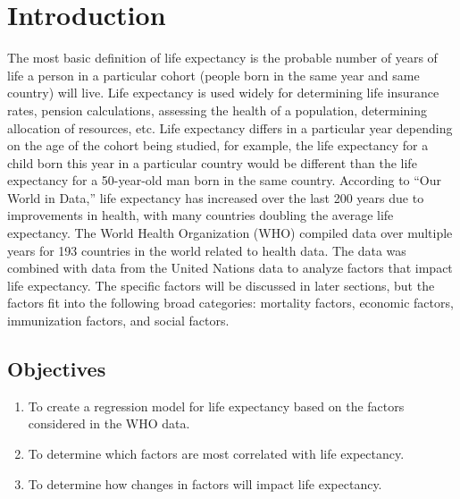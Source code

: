 \section{Introduction}
The most basic definition of life expectancy is the probable number of years of life a person in a particular cohort (people born in the same year and same country) will live. Life expectancy is used widely for determining life insurance rates, pension calculations, assessing the health of a population, determining allocation of resources, etc. Life expectancy differs in a particular year depending on the age of the cohort being studied, for example, the life expectancy for a child born this year in a particular country would be different than the life expectancy for a 50-year-old man born in the same country. According to “Our World in Data,” life expectancy has increased over the last 200 years due to improvements in health, with many countries doubling the average life expectancy. 
The World Health Organization (WHO) compiled data over multiple years for 193 countries in the world related to health data. The data was combined with data from the United Nations data to analyze factors that impact life expectancy. The specific factors will be discussed in later sections, but the factors fit into the following broad categories: mortality factors, economic factors, immunization factors, and social factors. 

\subsection{Objectives}
\label{objectives}


\begin{enumerate}
\item To create a regression model for life expectancy based on the factors considered in the WHO data.
\item To determine which factors are most correlated with life expectancy.
\item To determine how changes in factors will impact life expectancy.   
\end{enumerate}


